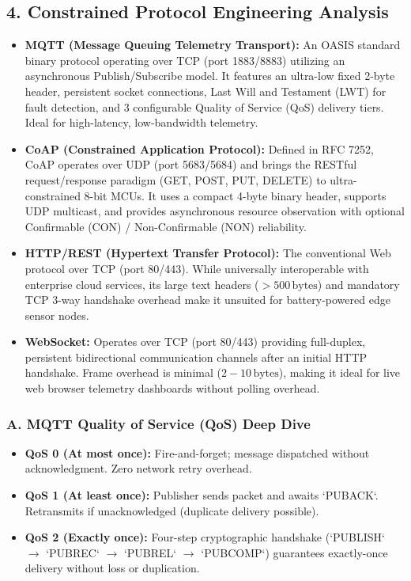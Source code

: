 \documentclass[11pt,a4paper]{article}
\begin{document}
\subsection*{4. Constrained Protocol Engineering Analysis}
\begin{itemize}[leftmargin=*]
    \item \textbf{MQTT (Message Queuing Telemetry Transport):} An OASIS standard binary protocol operating over TCP (port 1883/8883) utilizing an asynchronous Publish/Subscribe model. It features an ultra-low fixed 2-byte header, persistent socket connections, Last Will and Testament (LWT) for fault detection, and 3 configurable Quality of Service (QoS) delivery tiers. Ideal for high-latency, low-bandwidth telemetry.
    \item \textbf{CoAP (Constrained Application Protocol):} Defined in RFC 7252, CoAP operates over UDP (port 5683/5684) and brings the RESTful request/response paradigm (GET, POST, PUT, DELETE) to ultra-constrained 8-bit MCUs. It uses a compact 4-byte binary header, supports UDP multicast, and provides asynchronous resource observation with optional Confirmable (CON) / Non-Confirmable (NON) reliability.
    \item \textbf{HTTP/REST (Hypertext Transfer Protocol):} The conventional Web protocol over TCP (port 80/443). While universally interoperable with enterprise cloud services, its large text headers ($>500\,\text{bytes}$) and mandatory TCP 3-way handshake overhead make it unsuited for battery-powered edge sensor nodes.
    \item \textbf{WebSocket:} Operates over TCP (port 80/443) providing full-duplex, persistent bidirectional communication channels after an initial HTTP handshake. Frame overhead is minimal ($2-10\,\text{bytes}$), making it ideal for live web browser telemetry dashboards without polling overhead.
\end{itemize}

\subsubsection*{A. MQTT Quality of Service (QoS) Deep Dive}
\begin{itemize}[noitemsep]
    \item \textbf{QoS 0 (At most once):} Fire-and-forget; message dispatched without acknowledgment. Zero network retry overhead.
    \item \textbf{QoS 1 (At least once):} Publisher sends packet and awaits `PUBACK`. Retransmits if unacknowledged (duplicate delivery possible).
    \item \textbf{QoS 2 (Exactly once):} Four-step cryptographic handshake (`PUBLISH` $\rightarrow$ `PUBREC` $\rightarrow$ `PUBREL` $\rightarrow$ `PUBCOMP`) guarantees exactly-once delivery without loss or duplication.
\end{itemize}
\end{document}
